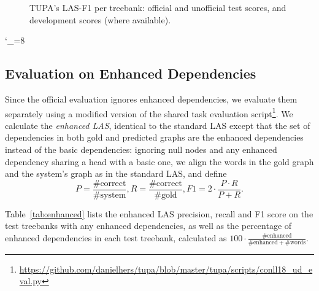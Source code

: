 \documentclass[11pt,a4paper]{article}
\begin{document}
\begin{figure*}[h!]
    \caption{TUPA's LAS-F1 per treebank: official and unofficial test scores, and development scores (where available).
    \label{fig:test_per_corpus}}
\end{figure*}
\catcode`\_=8


\subsection{Evaluation on Enhanced Dependencies}\label{sec:enhanced_results}

Since the official evaluation ignores enhanced dependencies,
we evaluate them separately using a modified version of the shared task evaluation
script\footnote{\url{https://github.com/danielhers/tupa/blob/master/tupa/scripts/conll18_ud_eval.py}}.
We calculate the \textit{enhanced LAS},
identical to the standard LAS except that the set of dependencies
in both gold and predicted graphs are the enhanced dependencies instead
of the basic dependencies:
ignoring null nodes and any enhanced dependency sharing a head with a basic one,
we align the words in the gold graph and the system's graph as in the standard LAS,
and define
\[
P=\frac{\#\mathrm{correct}}{\#\mathrm{system}},
R=\frac{\#\mathrm{correct}}{\#\mathrm{gold}},
F1=2\cdot\frac{P\cdot R}{P+R}.
\]

Table~\ref{tab:enhanced} lists the enhanced LAS precision, recall and F1 score
on the test treebanks with any enhanced dependencies,
as well as the percentage of enhanced dependencies in each test treebank,
calculated as
$100 \cdot \frac{\#\mathrm{enhanced}}{\#\mathrm{enhanced} + \#\mathrm{words}}$.
\end{document}
